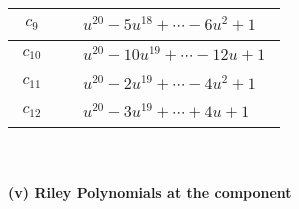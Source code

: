 \documentclass[1p]{elsarticle_modified}
\theoremstyle{definition}
\begin{document}
\begin{tabular}{m{50pt}|m{274pt}}
\hline $$\begin{aligned}c_{9}\end{aligned}$$&$\begin{aligned}
&u^{20}-5 u^{18}+\cdots-6 u^2+1
\end{aligned}$\\
\hline $$\begin{aligned}c_{10}\end{aligned}$$&$\begin{aligned}
&u^{20}-10 u^{19}+\cdots-12 u+1
\end{aligned}$\\
\hline $$\begin{aligned}c_{11}\end{aligned}$$&$\begin{aligned}
&u^{20}-2 u^{19}+\cdots-4 u^2+1
\end{aligned}$\\
\hline $$\begin{aligned}c_{12}\end{aligned}$$&$\begin{aligned}
&u^{20}-3 u^{19}+\cdots+4 u+1
\end{aligned}$\\
\hline
\end{tabular}\\~\\
\newpage\renewcommand{\arraystretch}{1}
\flushleft \textbf{(v) Riley Polynomials at the component}\newline \\
\end{document}
